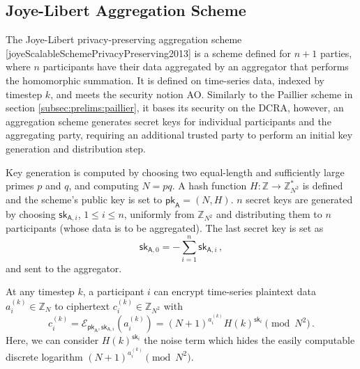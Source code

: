 % 
% 

\subsection{Joye-Libert Aggregation Scheme}\label{subsec:prelims:joye_libert_agg}
The Joye-Libert privacy-preserving aggregation scheme [joyeScalableSchemePrivacyPreserving2013] is a scheme defined for $n+1$ parties, where $n$ participants have their data aggregated by an aggregator that performs the homomorphic summation. It is defined on time-series data, indexed by timestep $k$, and meets the security notion AO. Similarly to the Paillier scheme in section \ref{subsec:prelims:paillier}, it bases its security on the DCRA, however, an aggregation scheme generates secret keys for individual participants and the aggregating party, requiring an additional trusted party to perform an initial key generation and distribution step.

Key generation is computed by choosing two equal-length and sufficiently large primes $p$ and $q$, and computing $N=pq$. A hash function $H:\mathbb{Z} \rightarrow \mathbb{Z}_{N^2}^*$ is defined and the scheme's public key is set to $\mathsf{pk}_{\mathsf{A}}=(N, H)$. $n$ secret keys are generated by choosing $\mathsf{sk}_{\mathsf{A}, i}$, $1\leq i\leq n$, uniformly from $\mathbb{Z}_{N^2}$ and distributing them to $n$ participants (whose data is to be aggregated). The last secret key is set as
\begin{equation}
    \mathsf{sk}_{\mathsf{A},0} = -\sum^{n}_{i=1}\mathsf{sk}_{\mathsf{A},i}\,,
\end{equation}
and sent to the aggregator.

At any timestep $k$, a participant $i$ can encrypt time-series plaintext data $a^{(k)}_{i} \in \mathbb{Z}_N$ to ciphertext $c^{(k)}_{i} \in \mathbb{Z}_{N^2}$ with
\begin{equation}
    c^{(k)}_{i} = \mathcal{E}_{\mathsf{pk}_{\mathsf{A}},\mathsf{sk}_{\mathsf{A},i}}\left(a^{(k)}_{i}\right) = (N+1)^{a^{(k)}_{i}} H(k)^{\mathsf{sk}_i} \pmod{N^2}\,.
\end{equation}
Here, we can consider $H(k)^{\mathsf{sk}_i}$ the noise term which hides the easily computable discrete logarithm $(N+1)^{a^{(k)}_{i}} \pmod{N^2}$.

